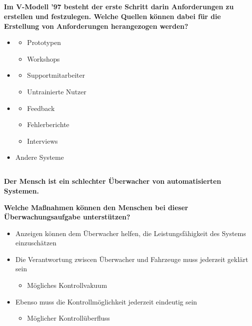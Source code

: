 \subsection{}\textbf{Im V-Modell ’97 besteht der erste Schritt darin Anforderungen zu erstellen und festzulegen. Welche Quellen können dabei für die Erstellung von Anforderungen herangezogen werden?}
\begin{itemize}
    \item \begin{itemize}
              \item Prototypen
              \item Workshops
          \end{itemize}
    \item \begin{itemize}
              \item Supportmitarbeiter
              \item Untrainierte Nutzer
          \end{itemize}
    \item\begin{itemize}
              \item Feedback
              \item Fehlerberichte
              \item Interviews
          \end{itemize}
    \item Andere Systeme
\end{itemize}

\subsection{}
\textbf{Der Mensch ist ein schlechter Überwacher von automatisierten Systemen.}

\textbf{Welche Maßnahmen können den Menschen bei dieser Überwachungsaufgabe unterstützen?}
\begin{itemize}
    \item Anzeigen können dem Überwacher helfen, die Leistungsfähigkeit des Systems einzuschätzen
    \item Die Verantwortung zwiscen Überwacher und Fahrzeuge muss jederzeit geklärt sein\begin{itemize}
              \item Mögliches Kontrollvakuum
          \end{itemize}
    \item Ebenso muss die Kontrollmöglichkeit jederzeit eindeutig sein\begin{itemize}
              \item Möglicher Kontrollüberfluss
          \end{itemize}
\end{itemize}

